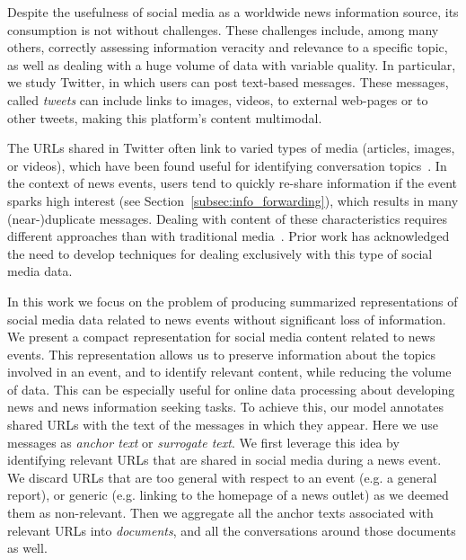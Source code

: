 Despite the usefulness of social media as a worldwide news information source,
its consumption is not without challenges.
%
These challenges include, among many others, correctly assessing information
veracity and relevance to a specific topic, as well as dealing with a huge
volume of data with variable quality. 
%
%
%
%
In particular, we study Twitter, in which users can post text-based messages.
%
These messages, called {\em tweets} can include links to images, videos, to
external web-pages or to other tweets, making this platform's content multimodal.

%
%
The URLs shared in Twitter often link to varied types of media (articles,
images, or videos), which have been found useful for identifying conversation
topics~\cite{mishne2012twanchor}.
%
In the context of news events, users tend to quickly re-share information if the
event sparks high interest (see Section~\ref{subsec:info_forwarding}), which
results in many (near-)duplicate messages.
%
Dealing with content of these characteristics requires different approaches
than with traditional media~\cite{Alonso:2017:WHH:3091478.3091484}.
%
Prior work has acknowledged the need to develop techniques for dealing
exclusively with this type of social media data.





In this work we focus on the problem of producing summarized representations of
social media data related to news events without significant loss of
information.
%
We present a compact representation for social media content related to news
events.
%
This representation allows us to preserve information about the topics involved
in an event, and to identify relevant content, while reducing the volume of
data.
%
This can be especially useful for online data processing about developing news
and news information seeking tasks.
%
To achieve this, our model annotates shared URLs with the text of the messages
in which they appear.
%
Here we use messages as {\em anchor text} or {\em surrogate text}. 
%
We first leverage this idea by identifying relevant URLs that are shared in
social media during a news event.
%
We discard URLs that are too general with respect to an event (e.g. a general
report), or generic (e.g. linking to the homepage of a news outlet) as we deemed
them as non-relevant.
%
Then we aggregate all the anchor texts associated with relevant URLs into {\em
documents}, and all the conversations around those documents as well. 

